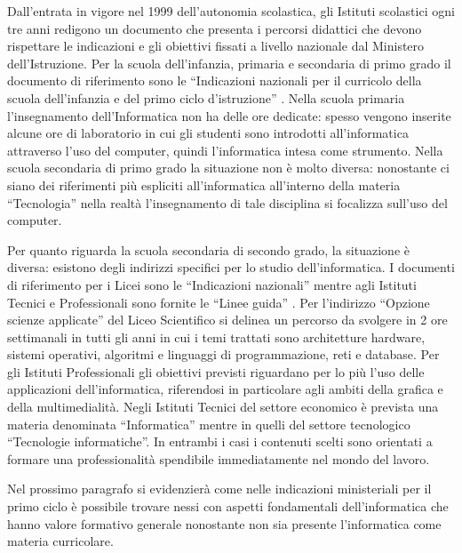 \documentclass[12pt]{report}
\begin{document}
Dall'entrata in vigore nel 1999 dell'autonomia scolastica, gli Istituti scolastici ogni tre anni redigono un documento che presenta i percorsi didattici che devono rispettare le indicazioni e gli obiettivi fissati a livello nazionale dal Ministero dell'Istruzione. Per la scuola dell'infanzia, primaria e secondaria di primo grado il documento di riferimento sono le ``Indicazioni nazionali per il curricolo della scuola dell'infanzia e del primo ciclo d'istruzione'' \cite{indicazioniNazionali}.
Nella scuola primaria l'insegnamento dell'Informatica non ha delle ore dedicate: spesso vengono inserite alcune ore di laboratorio in cui gli studenti sono introdotti all'informatica attraverso l'uso del computer, quindi l'informatica intesa come strumento.
Nella scuola secondaria di primo grado la situazione non è molto diversa: nonostante ci siano dei riferimenti più espliciti all'informatica all'interno della materia ``Tecnologia'' nella realtà l'insegnamento di tale disciplina si focalizza sull'uso del computer.

Per quanto riguarda la scuola secondaria di secondo grado, la situazione è diversa: esistono degli indirizzi specifici per lo studio dell'informatica. I documenti di riferimento per i Licei sono le ``Indicazioni nazionali'' \cite{IndicazioniLicei} mentre agli Istituti Tecnici e Professionali sono fornite le ``Linee guida'' \cite{IndicazioniIstituti}.
Per l'indirizzo “Opzione scienze applicate” del Liceo Scientifico si delinea un percorso da svolgere in 2 ore settimanali in tutti gli anni in cui i temi trattati sono architetture hardware, sistemi operativi, algoritmi e linguaggi di programmazione, reti e database.
Per gli Istituti Professionali gli obiettivi previsti riguardano per lo più l'uso delle applicazioni dell'informatica, riferendosi in particolare agli ambiti della grafica e della multimedialità.
Negli Istituti Tecnici del settore economico è prevista una materia denominata ``Informatica'' mentre in quelli del settore tecnologico ``Tecnologie informatiche''. In entrambi i casi i contenuti scelti sono orientati a formare una professionalità spendibile immediatamente nel mondo del lavoro.


Nel prossimo paragrafo si evidenzierà come nelle indicazioni ministeriali per il primo ciclo è possibile trovare nessi con aspetti fondamentali dell'informatica che hanno valore formativo generale nonostante non sia presente l'informatica come materia curricolare.
\end{document}
